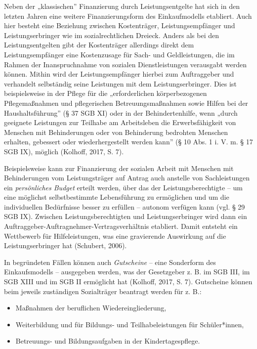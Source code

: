 \documentclass[
  letterpaper,
]{book}
\begin{document}
Neben der „klassischen'' Finanzierung durch Leistungsentgelte hat sich
in den letzten Jahren eine weitere Finanzierungsform des Einkaufmodells
etabliert. Auch hier besteht eine Beziehung zwischen Kostenträger,
Leistungsempfänger und Leistungserbringer wie im sozialrechtlichen
Dreieck. Anders als bei den Leistungsentgelten gibt der Kostenträger
allerdings direkt dem Leistungsempfänger eine Kostenzusage für Sach- und
Geldleistungen, die im Rahmen der Inanspruchnahme von sozialen
Dienstleistungen verausgabt werden können. Mithin wird der
Leistungsempfänger hierbei zum Auftraggeber und verhandelt selbständig
seine Leistungen mit dem Leistungserbringer. Dies ist beispielsweise in
der Pflege für die „erforderlichen körperbezogenen Pflegemaßnahmen und
pflegerischen Betreuungsmaßnahmen sowie Hilfen bei der
Haushaltsführung'' (§ 37 SGB XI) oder in der Behindertenhilfe, wenn
„durch geeignete Leistungen zur Teilhabe am Arbeitsleben die
Erwerbsfähigkeit von Menschen mit Behinderungen oder von Behinderung
bedrohten Menschen erhalten, gebessert oder wiederhergestellt werden
kann'' (§ 10 Abs. 1 i. V. m. § 17 SGB IX), möglich (Kolhoff, 2017, S.
7).

Beispielsweise kann zur Finanzierung der sozialen Arbeit mit Menschen
mit Behinderungen vom Leistungsträger auf Antrag auch anstelle von
Sachleistungen ein \emph{persönliches Budget} erteilt werden, über das
der Leistungsberechtigte -- um eine möglichst selbstbestimmte
Lebensführung zu ermöglichen und um die individuellen Bedürfnisse besser
zu erfüllen -- autonom verfügen kann (vgl. § 29 SGB IX). Zwischen
Leistungsberechtigten und Leistungserbringer wird dann ein
Auftraggeber-Auftragnehmer-Vertragsverhältnis etabliert. Damit entsteht
ein Wettbewerb für Hilfeleistungen, was eine gravierende Auswirkung auf
die Leistungserbringer hat (Schubert, 2006).

In begründeten Fällen können auch \emph{Gutscheine} -- eine Sonderform
des Einkaufsmodells -- ausgegeben werden, was der Gesetzgeber z. B. im
SGB III, im SGB XIII und im SGB II ermöglicht hat (Kolhoff, 2017, S. 7).
Gutscheine können beim jeweils zuständigen Sozialträger beantragt werden
für z. B.:

\begin{itemize}
\item
  Maßnahmen der beruflichen Wiedereingliederung,
\item
  Weiterbildung und für Bildungs- und Teilhabeleistungen für
  Schüler*innen,
\item
  Betreuungs- und Bildungsaufgaben in der Kindertagespflege.
\end{itemize}
\end{document}
